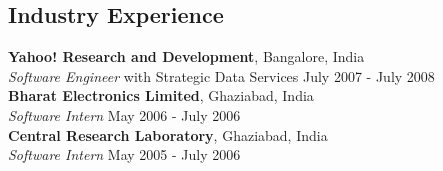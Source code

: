 \documentclass[margin,line,11pt]{res}
\begin{document}
\begin{resume}
\section{\sc Industry Experience}
{\bf Yahoo! Research and Development}, Bangalore, India \\
\emph{Software Engineer} with Strategic Data Services \hfill July 2007 - July 2008\\
{\bf Bharat Electronics Limited}, Ghaziabad, India \\
\emph{Software Intern} \hfill May 2006 - July 2006\\
{\bf Central Research Laboratory}, Ghaziabad, India \\
\emph{Software Intern} \hfill May 2005 - July 2006 


\end{resume}
\end{document}
